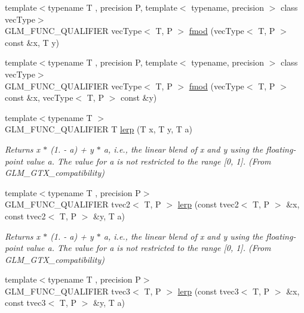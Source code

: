 \begin{DoxyCompactItemize}
\item 
{\footnotesize template$<$typename T , precision P, template$<$ typename, precision $>$ class vec\+Type$>$ }\\G\+L\+M\+\_\+\+F\+U\+N\+C\+\_\+\+Q\+U\+A\+L\+I\+F\+I\+E\+R vec\+Type$<$ T, P $>$ \hyperlink{namespaceglm_a8f5595207b335bcff3fa45a6f4a7767e}{fmod} (vec\+Type$<$ T, P $>$ const \&x, T y)
\item 
{\footnotesize template$<$typename T , precision P, template$<$ typename, precision $>$ class vec\+Type$>$ }\\G\+L\+M\+\_\+\+F\+U\+N\+C\+\_\+\+Q\+U\+A\+L\+I\+F\+I\+E\+R vec\+Type$<$ T, P $>$ \hyperlink{namespaceglm_aa23aa36dcfb6be51d71310412fdedfd1}{fmod} (vec\+Type$<$ T, P $>$ const \&x, vec\+Type$<$ T, P $>$ const \&y)
\item 
{\footnotesize template$<$typename T $>$ }\\G\+L\+M\+\_\+\+F\+U\+N\+C\+\_\+\+Q\+U\+A\+L\+I\+F\+I\+E\+R T \hyperlink{group__gtx__compatibility_ga5494ba3a95ea6594c86fc75236886864}{lerp} (T x, T y, T a)
\begin{DoxyCompactList}\small\item\em Returns x $\ast$ (1. -\/ a) + y $\ast$ a, i.\+e., the linear blend of x and y using the floating-\/point value a. The value for a is not restricted to the range \mbox{[}0, 1\mbox{]}. (From G\+L\+M\+\_\+\+G\+T\+X\+\_\+compatibility) \end{DoxyCompactList}\item 
{\footnotesize template$<$typename T , precision P$>$ }\\G\+L\+M\+\_\+\+F\+U\+N\+C\+\_\+\+Q\+U\+A\+L\+I\+F\+I\+E\+R tvec2$<$ T, P $>$ \hyperlink{group__gtx__compatibility_ga0aa79a146332650a1eb18ae996c653fe}{lerp} (const tvec2$<$ T, P $>$ \&x, const tvec2$<$ T, P $>$ \&y, T a)
\begin{DoxyCompactList}\small\item\em Returns x $\ast$ (1. -\/ a) + y $\ast$ a, i.\+e., the linear blend of x and y using the floating-\/point value a. The value for a is not restricted to the range \mbox{[}0, 1\mbox{]}. (From G\+L\+M\+\_\+\+G\+T\+X\+\_\+compatibility) \end{DoxyCompactList}\item 
{\footnotesize template$<$typename T , precision P$>$ }\\G\+L\+M\+\_\+\+F\+U\+N\+C\+\_\+\+Q\+U\+A\+L\+I\+F\+I\+E\+R tvec3$<$ T, P $>$ \hyperlink{group__gtx__compatibility_gaf4c885ac72b8879b05777cb516c555c9}{lerp} (const tvec3$<$ T, P $>$ \&x, const tvec3$<$ T, P $>$ \&y, T a)

\end{DoxyCompactItemize}
